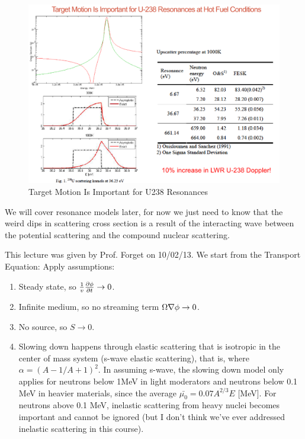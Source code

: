 \documentclass{school-22.211-notes}
\begin{document}
\begin{figure}[ht]
  \centering
  \includegraphics[width=6in]{images/sl-d/target-in-motion-resonance.png}
  \caption{Target Motion Is Important for U238 Resonances} \label{timr}
\end{figure}

We will cover resonance models later, for now we just need to know that the weird dips in scattering cross section is a result of the interacting wave between the potential scattering and the compound nuclear scattering. 


\clearpage
{} 
This lecture was given by Prof. Forget on 10/02/13. We start from the Transport Equation:
Apply assumptions:
\begin{enumerate}
\item Steady state, so $\frac{1}{v} \frac{\partial \phi}{\partial t} \to 0$. 
\item Infinite medium, so no streaming term $\Omega \nabla \phi \to 0$. 
\item No source, so $S \to 0$. 
\item Slowing down happens through elastic scattering that is isotropic in the center of mass system (s-wave elastic scattering), that is, 
  where $\alpha = (A-1/A+1)^2$. In assuming s-wave, the slowing down model only applies for neutrons below 1MeV in light moderators and neutrons below 0.1 MeV in heavier materials, since the average $\bar{\mu_0} = 0.07 A^{2/3}E$ [MeV].  For neutrons above 0.1 MeV, inelastic scattering from heavy nuclei becomes important and cannot be ignored (but I don't think we've ever addressed inelastic scattering in this course).
\end{enumerate}
\end{document}
